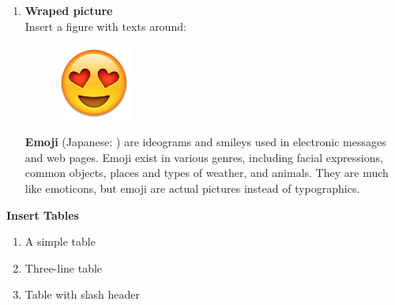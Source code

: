 \begin{solution}
\begin{enumerate}[nosep,label=(\arabic*)]
		\item \textbf{Wraped picture} \\
			Insert a figure with texts around: \\
\begin{latexample}[]
\begin{figure}
  \includegraphics[width=2.5cm]{./pic/07.png}
\end{figure}
\renewcommand{\rubysize}{0.6}
\renewcommand{\rubysep}{0.2pt}
\textbf{Emoji} (Japanese: ) are ideograms and smileys used in electronic messages and web pages. Emoji exist in various genres, including facial expressions, common objects, places and types of weather, and animals. They are much like emoticons, but emoji are actual pictures instead of typographics. 
\end{latexample}
	\end{enumerate}
\end{solution}

\begin{problem}[2]
	\textbf{Insert Tables}
	\begin{enumerate}[nosep,label=(\arabic*)]
		\item A simple table 
		\item Three-line table
		\item Table with slash header
	\end{enumerate}
\end{problem}

